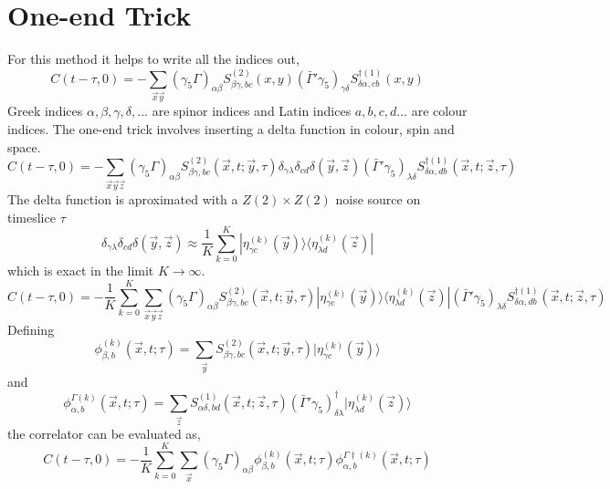 \documentclass[3p,preprint]{elsarticle}
\begin{document}
\section{One-end Trick}
For this method it helps to write all the indices out,
\begin{equation}
C(t - \tau, 0) = -\sum_{\vec{x} \vec{y}} (\gamma_5 \Gamma)_{\alpha \beta} S^{(2)}_{\beta\gamma,bc} (x,y) (\bar{ \Gamma }' \gamma_5)_{\gamma \delta} S^{\dagger (1)}_{\delta \alpha, cb} (x,y) 
\end{equation}
Greek indices $\alpha, \beta, \gamma, \delta, ...$ are spinor indices and Latin indices $a, b, c, d...$ are colour indices.
The one-end trick involves inserting a delta function in colour, spin and space.
\begin{equation}
C(t - \tau, 0) = -\sum_{\vec{x} \vec{y} \vec{z}} (\gamma_5 \Gamma)_{\alpha \beta} S^{(2)}_{\beta\gamma,b c} (\vec{x}, t; \vec{y}, \tau) \delta_{\gamma \lambda} \delta_{cd} \delta(\vec{y}, \vec{z}) (\bar{ \Gamma }' \gamma_5)_{\lambda \delta} S^{\dagger (1)}_{\delta \alpha, d b} (\vec{x}, t;\vec{z}, \tau) 
\end{equation}
The delta function is aproximated with a $Z(2) \times Z(2)$ noise source on timeslice $\tau$
\begin{equation}
\delta_{\gamma \lambda} \delta_{cd} \delta(\vec{y}, \vec{z}) \approx \frac{1}{K} \sum_{k = 0}^{K} | \eta^{(k)}_{\gamma c }(\vec{y})\rangle \langle \eta^{(k)}_{\lambda d }(\vec{z}) |
\end{equation}
which is exact in the limit $K \rightarrow \infty$.
\begin{equation}\label{eqn:oet}
C(t - \tau, 0) = -\frac{1}{K} \sum_{k = 0}^{K} \sum_{\vec{x} \vec{y} \vec{z}} (\gamma_5 \Gamma)_{\alpha \beta} S^{(2)}_{\beta\gamma,b c} (\vec{x}, t; \vec{y}, \tau) | \eta^{(k)}_{\gamma c }(\vec{y})\rangle \langle \eta^{(k)}_{\lambda d }(\vec{z}) | (\bar{ \Gamma }' \gamma_5)_{\lambda \delta} S^{\dagger (1)}_{\delta \alpha, d b} (\vec{x}, t;\vec{z}, \tau) 
\end{equation}
Defining
\begin{equation}
\phi^{(k)}_{\beta, b}(\vec{x}, t; \tau) = \sum_{\vec{y}} S^{(2)}_{\beta\gamma,b c} (\vec{x}, t; \vec{y}, \tau) | \eta^{(k)}_{\gamma c }(\vec{y})\rangle
\end{equation}
and
\begin{equation}
\phi^{\Gamma (k)}_{\alpha, b}(\vec{x}, t; \tau) = \sum_{\vec{z}} S^{(1)}_{\alpha \delta , b d} (\vec{x}, t;\vec{z}, \tau) (\bar{ \Gamma }' \gamma_5)^{\dagger}_{\delta \lambda} | \eta^{(k)}_{\lambda d }(\vec{z}) \rangle
\end{equation}
the correlator can be evaluated as,
\begin{equation}
C(t - \tau, 0) = -\frac{1}{K} \sum_{k = 0}^{K} \sum_{\vec{x} } (\gamma_5 \Gamma)_{\alpha \beta} \phi^{(k)}_{\beta, b}(\vec{x}, t; \tau) \phi^{\Gamma \dagger (k)}_{\alpha, b}(\vec{x}, t; \tau) 
\end{equation}
\end{document}

